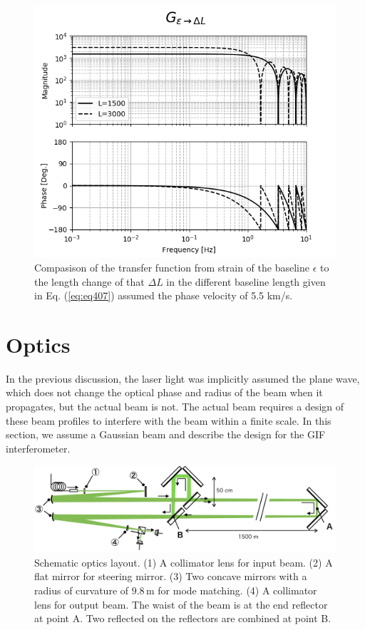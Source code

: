 \begin{figure}[h]
  \begin{center}
    \includegraphics[width=13.0cm]{./img_chap4/img412.png}
    \caption{Compasison of the transfer function from strain of the baseline $\epsilon$ to the length change of that $\Delta{L}$ in the different baseline length given in Eq. (\ref{eq:eq407}) assumed the phase velocity of 5.5 km/s.}\label{img:img411_a}
  \end{center}
\end{figure}

\section{Optics} \label{sec:sec43}
In the previous discussion, the laser light was implicitly assumed the plane wave, which does not change the optical phase and radius of the beam when it propagates, but the actual beam is not. The actual beam requires a design of these beam profiles to interfere with the beam within a finite scale. In this section, we assume a Gaussian beam and describe the design for the GIF interferometer.

\begin{figure}[h]
  \begin{center}   
    \includegraphics[width=14cm]{./img_chap4/img416.png}
    \caption{Schematic optics layout. (1) A collimator lens for input beam. (2) A flat mirror for steering mirror. (3) Two concave mirrors with a radius of curvature of $9.8\,\mathrm{m}$ for mode matching. (4) A collimator lens for output beam. The waist of the beam is at the end reflector at point A. Two reflected on the reflectors are combined at point B.}\label{img:img416}
  \end{center}
\end{figure}



